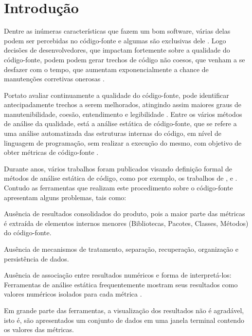 \chapter{Introdução}


Dentre as inúmeras características que fazem um bom software, várias delas podem ser percebidas no código-fonte e algumas são exclusivas dele \cite{Meirelles2013}. Logo decisões de desenvolvedores, que impactam fortemente sobre a qualidade do código-fonte, podem podem gerar trechos de código não coesos, que venham a se desfazer com o tempo, que aumentam exponencialmente a chance de manutenções corretivas onerosas \cite{Meirelles2013} \cite{beck2007implementation} \cite{beck1999}.



Portato avaliar continuamente a qualidade do código-fonte, pode identificar antecipadamente trechos a serem melhorados, atingindo assim maiores graus de manutenibilidade, coesão, entendimento e legibilidade \cite{fowler1999refactoring}. Entre os vários métodos de análise da qualidade, está a análise estática de código-fonte, que se refere a uma análise automatizada das estruturas internas do código, em nível de linguagem de programação, sem realizar a execução do mesmo, com objetivo de obter métricas de código-fonte \cite{Terra2008} 
\cite{Emanuelsson2008} \cite{Wichmann95}  \cite{Nielson:1999} 
\cite{Sommerville10}. 

Durante anos, vários trabalhos foram publicados visando definição formal de métodos de análise estática de código, como por exemplo, os trabalhos de , 
 e .
Contudo as ferramentas que realizam este procedimento sobre o código-fonte 
apresentam alguns problemas, tais como:


\begin{problems}
    \item Ausência de resultados consolidados do produto, pois a maior 
	parte das métricas é extraída de elementos internos menores (Bibliotecas, 
	Pacotes, Classes, Métodos) do código-fonte.
    
	\item Ausência de mecanismos de tratamento, separação, recuperação, 
	organização e persistência de dados. 
	
	\item Ausência de associação entre resultados numéricos e forma de 
	interpretá-los: Ferramentas de análise estática frequentemente mostram 
	seus resultados como valores numéricos isolados para cada métrica 
	\cite{Meirelles2013}. 
	
	\item Em grande parte das ferramentas, a visualização dos resultados não é 
	agradável, isto é, são apresentados um conjunto de dados em uma janela 
	terminal contendo os valores das métricas.
	
    \end{problems}
	
